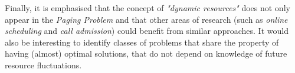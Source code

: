  Finally, it is emphasised that the concept of \emph{"dynamic resources"} does
 not only appear in the \emph{Paging Problem} and that other areas of
 research (such as \emph{online scheduling} and \emph{call admission}) could
 benefit from similar approaches. It would also be interesting to identify
 classes of problems that share the property of having (almost) optimal
 solutions, that do not depend on knowledge of future resource fluctuations.
